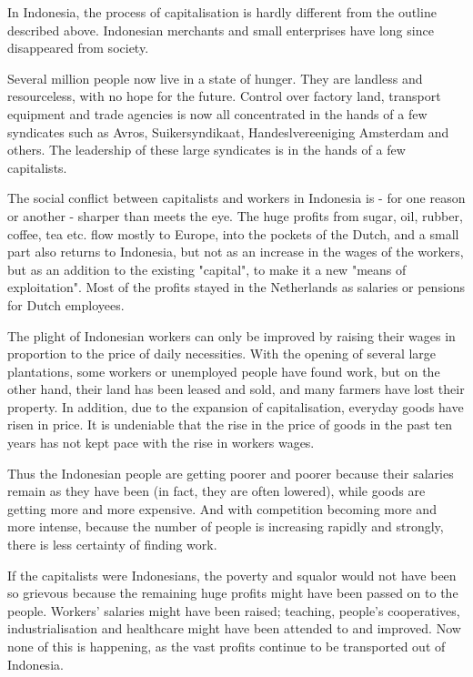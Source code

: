 In Indonesia, the process of capitalisation is hardly different from the outline described above. 
Indonesian merchants and small enterprises have long since disappeared from society.\nline

Several million people now live in a state of hunger. They are landless and resourceless, 
with no hope for the future. Control over factory land, transport equipment and trade agencies 
is now all concentrated in the hands of a few syndicates such as Avros, Suikersyndikaat, 
Handeslvereeniging Amsterdam and others. The leadership of these large syndicates is in the hands of a few capitalists.\nline

The social conflict between capitalists and workers in Indonesia is - for one reason or another - 
sharper than meets the eye. The huge profits from sugar, oil, rubber, coffee, tea etc. flow mostly 
to Europe, into the pockets of the Dutch, and a small part also returns to Indonesia, but not as an 
increase in the wages of the workers, but as an addition to the existing "capital", to make it a new 
"means of exploitation". Most of the profits stayed in the Netherlands as salaries or pensions for Dutch employees.\nline

The plight of Indonesian workers can only be improved by raising their wages in proportion to the price of daily 
necessities. With the opening of several large plantations, some workers or unemployed people have found work, 
but on the other hand, their land has been leased and sold, and many farmers have lost their property. In addition, 
due to the expansion of capitalisation, everyday goods have risen in price. It is undeniable that the rise in the 
price of goods in the past ten years has not kept pace with the rise in workers wages.\nline

Thus the Indonesian people are getting poorer and poorer because their salaries remain as they have been 
(in fact, they are often lowered), while goods are getting more and more expensive. And with competition 
becoming more and more intense, because the number of people is increasing rapidly and strongly, there is 
less certainty of finding work.\nline

If the capitalists were Indonesians, the poverty and squalor would not have been so grievous because the 
remaining huge profits might have been passed on to the people. Workers' salaries might have been raised; 
teaching, people's cooperatives, industrialisation and healthcare might have been attended to and improved. 
Now none of this is happening, as the vast profits continue to be transported out of Indonesia.\nline

